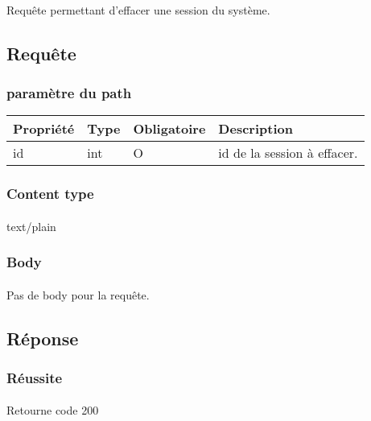 \paragraph{}
	Requête permettant d'effacer une session du système.

\subsection{Requête}
	\subsubsection{paramètre du path}
		\begin{center}
			\begin{tabularx}{\textwidth}{| T{0.2122\textwidth} | S{0.22\textwidth} | S{0.15\textwidth} | S{0.3\textwidth} |}
				\hline
				Propriété & Type & Obligatoire & Description \\
				\hline
				id & int & O & id de la session à effacer. \\
				\hline
			\end{tabularx}
		\end{center}
		
	\subsubsection{Content type}
		\paragraph{}
			text/plain
			
	\subsubsection{Body}
		\paragraph{}
			Pas de body pour la requête.

\subsection{Réponse}
	\subsubsection{Réussite}
		\paragraph{}
			Retourne code 200
			
